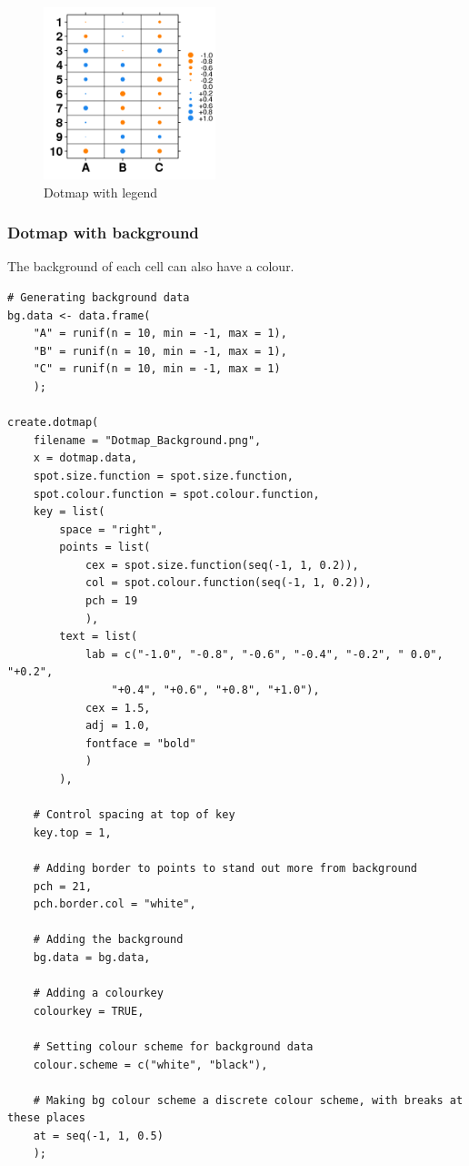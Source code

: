 \documentclass[letterpaper]{article}
\begin{document}
\begin{figure}[!ht]
  \begin{center}
     \includegraphics[width=50mm]{Figures/Dotmap_Legend.png}
     \caption{Dotmap with legend}
  \end{center}
\end{figure}

\subsubsection{Dotmap with background}
The background of each cell can also have a colour. 

\begin{verbatim}
# Generating background data
bg.data <- data.frame(
    "A" = runif(n = 10, min = -1, max = 1),
    "B" = runif(n = 10, min = -1, max = 1),
    "C" = runif(n = 10, min = -1, max = 1)
    );

create.dotmap(
    filename = "Dotmap_Background.png",
    x = dotmap.data,
    spot.size.function = spot.size.function,
    spot.colour.function = spot.colour.function,    
    key = list(
        space = "right",
        points = list(
            cex = spot.size.function(seq(-1, 1, 0.2)),
            col = spot.colour.function(seq(-1, 1, 0.2)),
            pch = 19
            ),
        text = list(
            lab = c("-1.0", "-0.8", "-0.6", "-0.4", "-0.2", " 0.0", "+0.2", 
                "+0.4", "+0.6", "+0.8", "+1.0"),
            cex = 1.5,
            adj = 1.0,
            fontface = "bold"
            )
        ),
    
    # Control spacing at top of key
    key.top = 1,

    # Adding border to points to stand out more from background
    pch = 21,
    pch.border.col = "white",
    
    # Adding the background
    bg.data = bg.data,

    # Adding a colourkey
    colourkey = TRUE,
    
    # Setting colour scheme for background data
    colour.scheme = c("white", "black"),
    
    # Making bg colour scheme a discrete colour scheme, with breaks at these places
    at = seq(-1, 1, 0.5)
    );
\end{verbatim}
\end{document}
